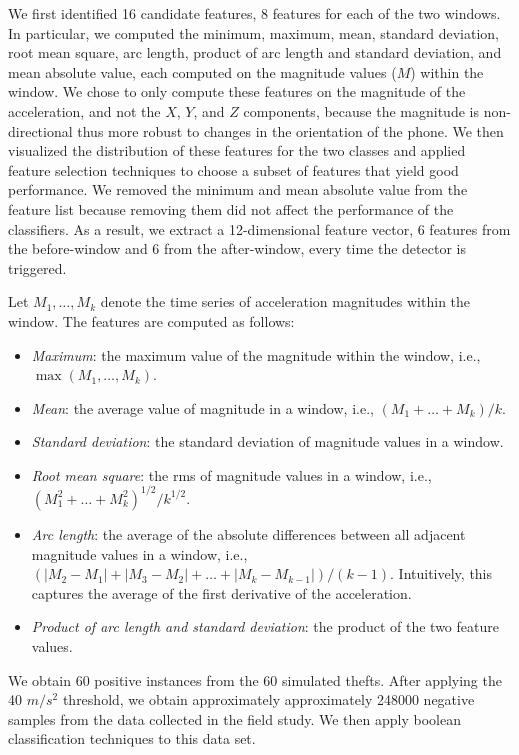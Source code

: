 \documentclass{soups}
\begin{document}
We first identified 16 candidate features, 8 features for each of the two windows.
In particular, we computed the minimum, maximum, mean, standard deviation, root mean square, arc length, product of arc length and standard deviation, and mean absolute value, each computed on the magnitude values ($M$) within the window.
We chose to only compute these features on the magnitude of the acceleration, and not the $X$, $Y$, and $Z$ components, because the magnitude is non-directional thus more robust to changes in the orientation of the phone. 
We then visualized the distribution of these features for the two classes and applied feature selection techniques to choose a subset of features that yield good performance.
We removed the minimum and mean absolute value from the feature list because removing them did not affect the performance of the classifiers. 
As a result, we extract a 12-dimensional feature vector, 6 features from the before-window and 6 from the after-window, every time the detector is triggered.

Let $M_1,\dots,M_k$ denote the time series of acceleration magnitudes within the window.
The features are computed as follows:
\begin{itemize}
\item \emph{Maximum}: the maximum value of the magnitude within the window, i.e., $\max(M_1,\dots,M_k)$.
\item \emph{Mean}: the average value of magnitude in a window, i.e., $(M_1+\dots + M_k)/k$.
\item \emph{Standard deviation}: the standard deviation of magnitude values in a window.
\item \emph{Root mean square}: the rms of magnitude values in a window, i.e., $(M_1^2 + \dots + M_k^2)^{1/2}/k^{1/2}$.
\item \emph{Arc length}: the average of the absolute differences between all adjacent magnitude values in a window, i.e., $(|M_2-M_1| + |M_3-M_2| + \dots + |M_k-M_{k-1}|)/(k-1)$.
Intuitively, this captures the average of the first derivative of the acceleration.
\item \emph{Product of arc length and standard deviation}: the product of the two feature values.
\end{itemize}

We obtain 60 positive instances from the 60 simulated thefts.
After applying the 40 $m/s^2$ threshold, we obtain approximately approximately 248000 negative samples from the data collected in the field study. 
We then apply boolean classification techniques to this data set.
\end{document}
